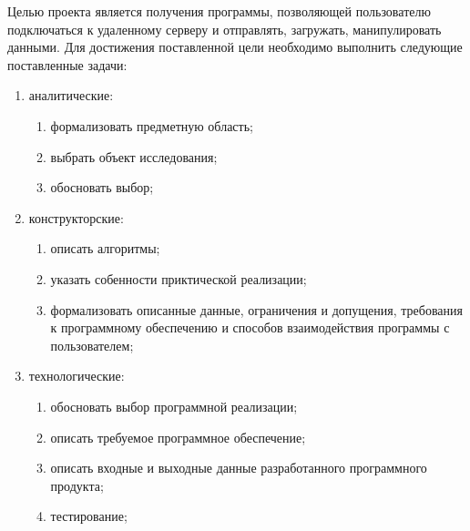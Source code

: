 Целью проекта является получения программы, позволяющей пользователю подключаться к удаленному серверу и отправлять, загружать, манипулировать данными. 
Для достижения поставленной цели необходимо выполнить следующие поставленные задачи:
\begin{enumerate}
	\item аналитические:
	\begin{enumerate}
		\item формализовать предметную область;
		\item выбрать объект исследования;
		\item обосновать выбор;
	\end{enumerate}
	\item конструкторские:
	\begin{enumerate}
		\item описать алгоритмы;
		\item указать собенности приктической реализации;
		\item формализовать описанные данные, ограничения и допущения, требования к программному обеспечению и способов взаимодействия программы с пользователем;
	\end{enumerate}
	\item технологические:
	\begin{enumerate}
		\item обосновать выбор программной реализации;
		\item описать требуемое программное обеспечение;
		\item описать входные и выходные данные разработанного программного продукта;
		\item тестирование;
	\end{enumerate}
\end{enumerate}